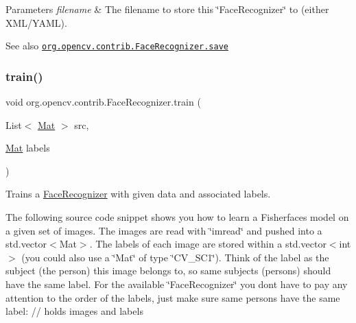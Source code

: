 \begin{DoxyParams}{Parameters}
{\em filename} & The filename to store this \char`\"{}\+Face\+Recognizer\char`\"{} to (either X\+M\+L/\+Y\+A\+ML).\\
\hline
\end{DoxyParams}
\begin{DoxySeeAlso}{See also}
\href{http://docs.opencv.org/modules/contrib/doc/facerec_api.html#facerecognizer-save}{\tt org.\+opencv.\+contrib.\+Face\+Recognizer.\+save} 
\end{DoxySeeAlso}
\mbox{\label{classorg_1_1opencv_1_1contrib_1_1_face_recognizer_a2b9e657ee7276997ab184449c3251c08}} 
\subsubsection{\texorpdfstring{train()}{train()}}
{\footnotesize\ttfamily void org.\+opencv.\+contrib.\+Face\+Recognizer.\+train (\begin{DoxyParamCaption}\item[{List$<$ \mbox{\hyperlink{classorg_1_1opencv_1_1core_1_1_mat}{Mat}} $>$}]{src,  }\item[{\mbox{\hyperlink{classorg_1_1opencv_1_1core_1_1_mat}{Mat}}}]{labels }\end{DoxyParamCaption})}

Trains a \mbox{\hyperlink{classorg_1_1opencv_1_1contrib_1_1_face_recognizer}{Face\+Recognizer}} with given data and associated labels.

The following source code snippet shows you how to learn a Fisherfaces model on a given set of images. The images are read with \char`\"{}imread\char`\"{} and pushed into a {\ttfamily std.\+vector$<$\+Mat$>$}. The labels of each image are stored within a {\ttfamily std.\+vector$<$int$>$} (you could also use a \char`\"{}\+Mat\char`\"{} of type \char`\"{}\+C\+V\+\_\+S\+C1\char`\"{}). Think of the label as the subject (the person) this image belongs to, so same subjects (persons) should have the same label. For the available \char`\"{}\+Face\+Recognizer\char`\"{} you don\textquotesingle{}t have to pay any attention to the order of the labels, just make sure same persons have the same label\+: // holds images and labels {\ttfamily }


